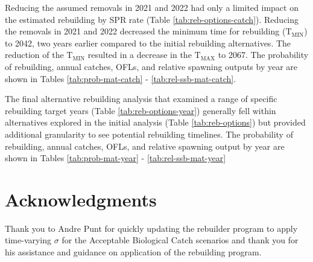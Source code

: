 \documentclass[11pt,
  english,
  a4paper,
]{article}
\begin{document}
\leavevmode\tagmcend\tagstructend\par


Reducing the assumed removals in 2021 and 2022 had only a limited impact on the estimated rebuilding by SPR rate (Table \ref{tab:reb-options-catch}). Reducing the removals in 2021 and 2022 decreased the minimum time for rebuilding ({\(\text{T}_\text{MIN}\)\leavevmode\tagmcend\tagstructend}) to 2042, two years earlier compared to the initial rebuilding alternatives. The reduction of the {\(\text{T}_\text{MIN}\)\leavevmode\tagmcend\tagstructend} resulted in a decrease in the {\(\text{T}_\text{MAX}\)\leavevmode\tagmcend\tagstructend} to 2067. The probability of rebuilding, annual catches, OFLs, and relative spawning outputs by year are shown in Tables \ref{tab:prob-mat-catch} - \ref{tab:rel-ssb-mat-catch}.

\leavevmode\tagmcend\tagstructend\par


The final alternative rebuilding analysis that examined a range of specific rebuilding target years (Table \ref{tab:reb-options-year}) generally fell within alternatives explored in the initial analysis (Table \ref{tab:reb-options}) but provided additional granularity to see potential rebuilding timelines. The probability of rebuilding, annual catches, OFLs, and relative spawning output by year are shown in Tables \ref{tab:prob-mat-year} - \ref{tab:rel-ssb-mat-year}

\leavevmode\tagmcend\tagstructend\par


\hypertarget{acknowledgments}{%
\section{Acknowledgments}\label{acknowledgments}}

\leavevmode\tagmcend\tagstructend


Thank you to Andre Punt for quickly updating the rebuilder program to apply time-varying {\(\sigma\)\leavevmode\tagmcend\tagstructend} for the Acceptable Biological Catch scenarios and thank you for his assistance and guidance on application of the rebuilding program.
\end{document}
